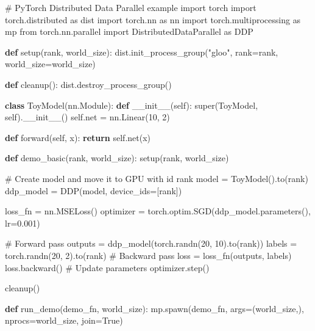 \documentclass[
  letterpaper,
  DIV=11,
  numbers=noendperiod]{scrreprt}
\newenvironment{Shaded}{\begin{snugshade}}{\end{snugshade}}
\newcommand{\BuiltInTok}[1]{\textcolor[rgb]{0.00,0.23,0.31}{#1}}
\newcommand{\CommentTok}[1]{\textcolor[rgb]{0.37,0.37,0.37}{#1}}
\newcommand{\ControlFlowTok}[1]{\textcolor[rgb]{0.00,0.23,0.31}{\textbf{#1}}}
\newcommand{\DecValTok}[1]{\textcolor[rgb]{0.68,0.00,0.00}{#1}}
\newcommand{\FloatTok}[1]{\textcolor[rgb]{0.68,0.00,0.00}{#1}}
\newcommand{\FunctionTok}[1]{\textcolor[rgb]{0.28,0.35,0.67}{#1}}
\newcommand{\ImportTok}[1]{\textcolor[rgb]{0.00,0.46,0.62}{#1}}
\newcommand{\KeywordTok}[1]{\textcolor[rgb]{0.00,0.23,0.31}{\textbf{#1}}}
\newcommand{\NormalTok}[1]{\textcolor[rgb]{0.00,0.23,0.31}{#1}}
\newcommand{\OperatorTok}[1]{\textcolor[rgb]{0.37,0.37,0.37}{#1}}
\newcommand{\StringTok}[1]{\textcolor[rgb]{0.13,0.47,0.30}{#1}}
\newcommand{\VariableTok}[1]{\textcolor[rgb]{0.07,0.07,0.07}{#1}}
\begin{document}
\begin{Shaded}
\begin{Highlighting}[]
\CommentTok{\# PyTorch Distributed Data Parallel example}
\ImportTok{import}\NormalTok{ torch}
\ImportTok{import}\NormalTok{ torch.distributed }\ImportTok{as}\NormalTok{ dist}
\ImportTok{import}\NormalTok{ torch.nn }\ImportTok{as}\NormalTok{ nn}
\ImportTok{import}\NormalTok{ torch.multiprocessing }\ImportTok{as}\NormalTok{ mp}
\ImportTok{from}\NormalTok{ torch.nn.parallel }\ImportTok{import}\NormalTok{ DistributedDataParallel }\ImportTok{as}\NormalTok{ DDP}

\KeywordTok{def}\NormalTok{ setup(rank, world\_size):}
\NormalTok{    dist.init\_process\_group(}\StringTok{"gloo"}\NormalTok{, rank}\OperatorTok{=}\NormalTok{rank, world\_size}\OperatorTok{=}\NormalTok{world\_size)}

\KeywordTok{def}\NormalTok{ cleanup():}
\NormalTok{    dist.destroy\_process\_group()}

\KeywordTok{class}\NormalTok{ ToyModel(nn.Module):}
    \KeywordTok{def} \FunctionTok{\_\_init\_\_}\NormalTok{(}\VariableTok{self}\NormalTok{):}
        \BuiltInTok{super}\NormalTok{(ToyModel, }\VariableTok{self}\NormalTok{).}\FunctionTok{\_\_init\_\_}\NormalTok{()}
        \VariableTok{self}\NormalTok{.net }\OperatorTok{=}\NormalTok{ nn.Linear(}\DecValTok{10}\NormalTok{, }\DecValTok{2}\NormalTok{)}
        
    \KeywordTok{def}\NormalTok{ forward(}\VariableTok{self}\NormalTok{, x):}
        \ControlFlowTok{return} \VariableTok{self}\NormalTok{.net(x)}

\KeywordTok{def}\NormalTok{ demo\_basic(rank, world\_size):}
\NormalTok{    setup(rank, world\_size)}
    
    \CommentTok{\# Create model and move it to GPU with id rank}
\NormalTok{    model }\OperatorTok{=}\NormalTok{ ToyModel().to(rank)}
\NormalTok{    ddp\_model }\OperatorTok{=}\NormalTok{ DDP(model, device\_ids}\OperatorTok{=}\NormalTok{[rank])}
    
\NormalTok{    loss\_fn }\OperatorTok{=}\NormalTok{ nn.MSELoss()}
\NormalTok{    optimizer }\OperatorTok{=}\NormalTok{ torch.optim.SGD(ddp\_model.parameters(), lr}\OperatorTok{=}\FloatTok{0.001}\NormalTok{)}
    
    \CommentTok{\# Forward pass}
\NormalTok{    outputs }\OperatorTok{=}\NormalTok{ ddp\_model(torch.randn(}\DecValTok{20}\NormalTok{, }\DecValTok{10}\NormalTok{).to(rank))}
\NormalTok{    labels }\OperatorTok{=}\NormalTok{ torch.randn(}\DecValTok{20}\NormalTok{, }\DecValTok{2}\NormalTok{).to(rank)}
    \CommentTok{\# Backward pass}
\NormalTok{    loss }\OperatorTok{=}\NormalTok{ loss\_fn(outputs, labels)}
\NormalTok{    loss.backward()}
    \CommentTok{\# Update parameters}
\NormalTok{    optimizer.step()}
    
\NormalTok{    cleanup()}

\KeywordTok{def}\NormalTok{ run\_demo(demo\_fn, world\_size):}
\NormalTok{    mp.spawn(demo\_fn, args}\OperatorTok{=}\NormalTok{(world\_size,), nprocs}\OperatorTok{=}\NormalTok{world\_size, join}\OperatorTok{=}\VariableTok{True}\NormalTok{)}
\end{Highlighting}
\end{Shaded}
\end{document}
